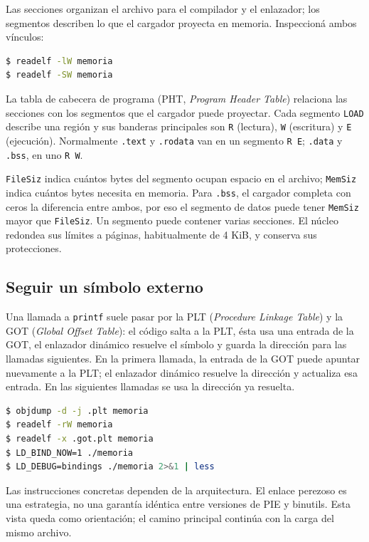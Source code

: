 \documentclass[11pt,a4paper]{article}
\begin{document}
Las secciones organizan el archivo para el compilador y el enlazador; los
segmentos describen lo que el cargador proyecta en memoria. Inspeccioná ambos
vínculos:

\begin{lstlisting}[language=bash]
$ readelf -lW memoria
$ readelf -SW memoria
\end{lstlisting}

La tabla de cabecera de programa (PHT, \emph{Program Header Table}) relaciona
las secciones con los segmentos que el cargador puede proyectar. Cada
segmento \texttt{LOAD} describe una región y sus banderas principales son
\texttt{R} (lectura), \texttt{W} (escritura) y \texttt{E} (ejecución).
Normalmente \texttt{.text} y \texttt{.rodata} van en un segmento \texttt{R E};
\texttt{.data} y \texttt{.bss}, en uno \texttt{R W}.

\texttt{FileSiz} indica cuántos bytes del segmento ocupan espacio en el
archivo; \texttt{MemSiz} indica cuántos bytes necesita en memoria. Para
\texttt{.bss}, el cargador completa con ceros la diferencia entre ambos, por
eso el segmento de datos puede tener \texttt{MemSiz} mayor que
\texttt{FileSiz}. Un segmento puede contener varias secciones. El núcleo
redondea sus límites a páginas, habitualmente de 4 KiB, y conserva sus
protecciones.

\subsection{Seguir un símbolo externo}

Una llamada a \texttt{printf} suele pasar por la PLT (\emph{Procedure Linkage
Table}) y la GOT (\emph{Global Offset Table}): el código salta a la PLT,
ésta usa una entrada de la GOT, el enlazador dinámico resuelve el símbolo y
guarda la dirección para las llamadas siguientes. En la primera llamada, la
entrada de la GOT puede apuntar nuevamente a la PLT; el enlazador dinámico
resuelve la dirección y actualiza esa entrada. En las siguientes llamadas se
usa la dirección ya resuelta.

\begin{lstlisting}[language=bash]
$ objdump -d -j .plt memoria
$ readelf -rW memoria
$ readelf -x .got.plt memoria
$ LD_BIND_NOW=1 ./memoria
$ LD_DEBUG=bindings ./memoria 2>&1 | less
\end{lstlisting}

Las instrucciones concretas dependen de la arquitectura. El enlace perezoso
es una estrategia, no una garantía idéntica entre versiones de PIE y binutils.
Esta vista queda como orientación; el camino principal continúa con la carga
del mismo archivo.
\end{document}

